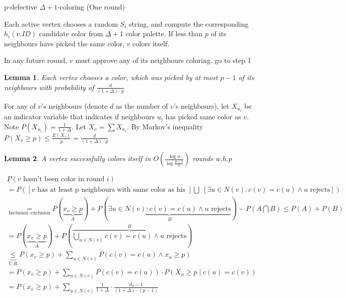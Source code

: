 \documentclass[11pt]{article}
\newtheorem{lemma}{Lemma}
\begin{document}
\begin{algorithm}
\caption{p-defective $\Delta+1$-coloring (One round)}
\begin{algorithmic}[1]
\State Each active vertex chooses a random $S_i$ string, and compute the corresponding $h_i(v.ID)$ candidate color from $\Delta+1$ color palette.
\State If less than $p$ of its neighbours have picked the same color, $v$ colors itself.

    \State In any future round, $v$ must approve any of its neighbours coloring.
\Else
    \State go to step 1
\EndIf
\end{algorithmic}
\end{algorithm}

\begin{lemma}
\label{prob_pick_good_color}
Each vertex chooses a color, which was picked by at most $p-1$ of its neighbours with probability of $\frac{d}{(1+\Delta) \cdot p}$
\end{lemma}
For any of $v$'s neighbours (denote $d$ as the number of $v$'s neighbours), let $X_{u_i}$ be an indicator variable that indicates if neighbours $u_i$ has picked same color as $v$. Note $P(X_{u_i}) = \frac{1}{1 + \Delta}$. Let $X_v = \sum{X_{u_i}}$. By Markov's inequality $P(X_v \ge p) \le \frac{E(X_v)}{p} = \frac{d}{(1+\Delta) \cdot p}$

\begin{lemma}
\label{rounds}
A vertex successfully colors itself in $O(\frac{\log{n}}{\log{\frac{p-1}{2}}})$ rounds w.h.p
\end{lemma}

\begin{gather*}
P(v \text{ hasn't been color in round } i)\\ 
= P([v \text{ has at least p neighbours with same color as his }] \bigcup \; [\exists u\in N(v): c(v)=c(u) \land u \text{ rejects}]) \\
\underset{\text{Inclusion–exclusion}}{=} P(\underset{A}{\underbrace{x_v \ge p}}) + P(\underset{B}{\underbrace{\exists u\in N(v): c(v)=c(u) \land u \text{ rejects}}}) - P(A \bigcap B) \le P(A) + P(B) \\
= P(\underset{A}{\underbrace{x_v \ge p}}) + P(\overset{B}{\overbrace{\bigcup_{u \in N(v)} c(v)=c(u) \land u \text{ rejects}}}) \\
\underset{\text{U.B}}{\underbrace{\le}} P(x_v \ge p) + \sum_{u \in N(v)}{P(c(v)=c(u) \land x_u \ge p)} \\
=  P(x_v \ge p) + \sum_{u \in N(v)}{P(c(v)=c(u)) \cdot P(X_u \ge p \mid c(u) = c(v))} \\
= P(x_v \ge p) + \sum_{u \in N(v)}{\frac{1}{1 + \Delta} \cdot \frac{d_{u}-1}{(1+ \Delta) \cdot (p-1)} }
\end{gather*}
\end{document}
